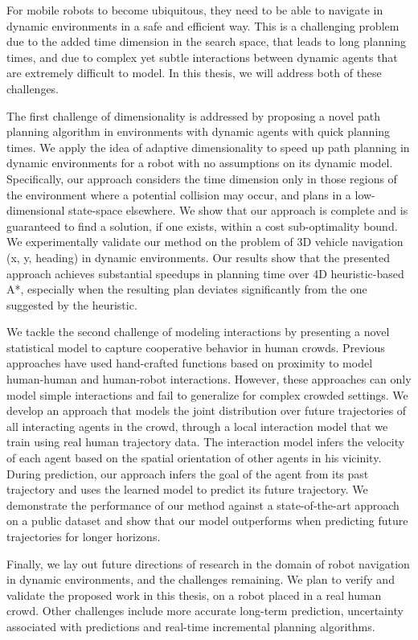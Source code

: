 For mobile robots to become ubiquitous, they need to be able to navigate in dynamic environments in a safe and efficient way. This is a challenging problem due to the added time dimension in the search space, that leads to long planning times, and due to complex yet subtle interactions between dynamic agents that are extremely difficult to model. In this thesis, we will address both of these challenges.

The first challenge of dimensionality is addressed by proposing a novel path planning algorithm in environments with dynamic agents with quick planning times. We apply the idea of adaptive dimensionality to speed up path planning in dynamic environments for a robot with no assumptions on its dynamic model. Specifically, our approach considers the time dimension only in those regions of the environment where a potential collision may occur, and plans in a low-dimensional state-space elsewhere. We show that our approach is complete and is guaranteed to find a solution, if one exists, within a cost sub-optimality bound. We experimentally validate our method on the problem of 3D vehicle navigation (x, y, heading) in dynamic environments. Our results show that the presented approach achieves substantial speedups in planning time over 4D heuristic-based A*, especially when the resulting plan deviates significantly from the one suggested by the heuristic.

We tackle the second challenge of modeling interactions by presenting a novel statistical model to capture cooperative behavior in human crowds. Previous approaches have used hand-crafted functions based on proximity to model human-human and human-robot interactions. However, these approaches can only model simple interactions and fail to generalize for complex crowded settings. We develop an approach that models the joint distribution over future trajectories of all interacting agents in the crowd, through a local interaction model that we train using real human trajectory data. The interaction model infers the velocity of each agent based on the spatial orientation of other agents in his vicinity. During prediction, our approach infers the goal of the agent from its past trajectory and uses the learned model to predict its future trajectory. We demonstrate the performance of our method against a state-of-the-art approach on a public dataset and show that our model outperforms when predicting future trajectories for longer horizons.

Finally, we lay out future directions of research in the domain of robot navigation in dynamic environments, and the challenges remaining. We plan to verify and validate the proposed work in this thesis, on a robot placed in a real human crowd. Other challenges include more accurate long-term prediction, uncertainty associated with predictions and real-time incremental planning algorithms.

